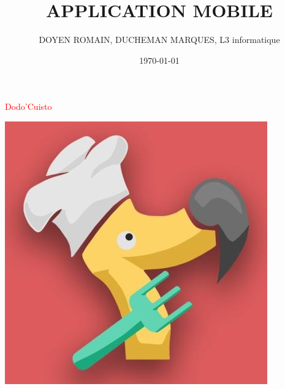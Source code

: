 \documentclass{article}
\title{APPLICATION MOBILE}
\author{DOYEN ROMAIN, DUCHEMAN MARQUES, L3 informatique}
\date{\today}
\begin{document}
\maketitle \center \textcolor{red}{Dodo'Cuisto}

\begin{center}
    \includegraphics[scale=0.6]{logo.png} 
\end{center}

\newpage
\end{document}

